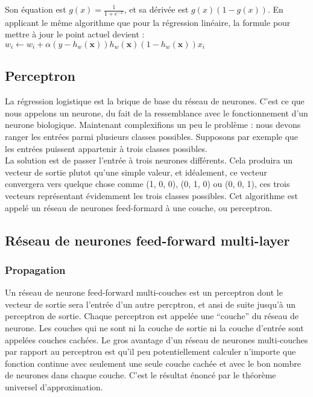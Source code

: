 Son équation est $g(x) = \frac{1}{1 + e^{-x}}$, et sa dérivée est $g(x)(1 - g(x))$. En applicant le même algorithme que pour la régression linéaire, la formule pour mettre à jour le point actuel devient :\\

$w_i \leftarrow w_i + \alpha (y - h_w(\textbf{x}))
h_w(\textbf{x})(1 - h_w(\textbf{x}))x_i$\\

\subsection{Perceptron}

La régression logistique est la brique de base du réseau de neurones. C'est ce que nous appelons un neurone, du fait de la ressemblance avec le fonctionnement d'un neurone biologique. Maintenant complexifions un peu le problème : nous devons ranger les entrées parmi plusieurs classes possibles. Supposons par exemple que les entrées puissent appartenir à trois classes possibles.\\
La solution est de passer l'entrée à trois neurones différents. Cela produira un vecteur de sortie plutot qu'une simple valeur, et idéalement, ce vecteur convergera vers quelque chose comme (1, 0, 0), (0, 1, 0) ou (0, 0, 1), ces trois vecteurs représentant évidemment les trois classes possibles. Cet algorithme est appelé un réseau de neurones feed-formard à une couche, ou perceptron.

\begin{center}
\end{center}

\subsection{Réseau de neurones feed-forward multi-layer}
\subsubsection{Propagation}
Un réseau de neurone feed-forward multi-couches est un perceptron dont le vecteur de sortie sera l'entrée d'un autre percptron, et ansi de suite jusqu'à un perceptron de sortie. Chaque perceptron est appelée une ``couche'' du réseau de neurone. Les couches qui ne sont ni la couche de sortie ni la couche d'entrée sont appelées couches cachées. Le gros avantage d'un réseau de neurones multi-couches par rapport au perceptron est qu'il peu potentiellement calculer n'importe que fonction continue avec seulement une seule couche cachée et avec le bon nombre de neurones dans chaque couche. C'est le résultat énoncé par le théorème universel d'approximation.\\

